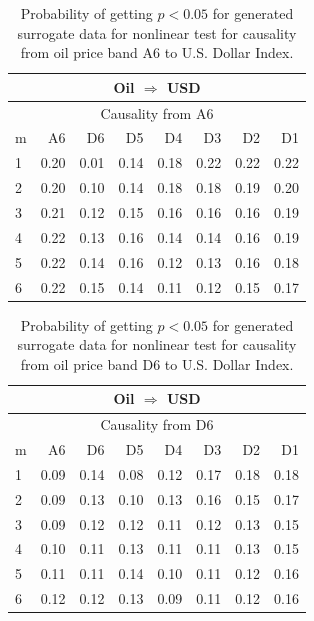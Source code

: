 %
%
\begin{table}[H]
\begin{center}
\begin{tabular}{l|r r r r r r r}
\hline\hline
\multicolumn{8}{c}{Oil $\Rightarrow$ USD}\\
\hline
\multicolumn{8}{c}{Causality from A6}\\
\hline\hline
m & A6 & D6 & D5 & D4 & D3 & D2 & D1 \\
\hline
1 & \cellcolor{mygrey}0.20 & 0.01 & 0.14 & 0.18 & \cellcolor{mygrey}0.22 & 0.22 & \cellcolor{mygrey}0.22 \\
2 & \cellcolor{mygrey}0.20 & 0.10 & 0.14 & 0.18 & \cellcolor{mygrey}0.18 & 0.19 & \cellcolor{mygrey}0.20 \\
3 & \cellcolor{mygrey}0.21 & 0.12 & 0.15 & 0.16 & \cellcolor{mygrey}0.16 & 0.16 & \cellcolor{mygrey}0.19 \\
4 & \cellcolor{mygrey}0.22 & 0.13 & 0.16 & 0.14 & \cellcolor{mygrey}0.14 & 0.16 & \cellcolor{mygrey}0.19 \\
5 & \cellcolor{mygrey}0.22 & 0.14 & 0.16 & 0.12 & \cellcolor{mygrey}0.13 & 0.16 & \cellcolor{mygrey}0.18 \\
6 & \cellcolor{mygrey}0.22 & 0.15 & 0.14 & 0.11 & \cellcolor{mygrey}0.12 & 0.15 & \cellcolor{mygrey}0.17 \\
\hline\hline
\end{tabular}
\caption{Probability of getting $p < 0.05$ for generated surrogate data for nonlinear test for causality from oil price band A6 to U.S. Dollar Index.}
\end{center}
\end{table}

%
%
\begin{table}[H]
\begin{center}
\begin{tabular}{l|r r r r r r r}
\hline\hline
\multicolumn{8}{c}{Oil $\Rightarrow$ USD}\\
\hline
\multicolumn{8}{c}{Causality from D6}\\
\hline\hline
m & A6 & D6 & D5 & D4 & D3 & D2 & D1 \\
\hline
1 & 0.09 & 0.14 & 0.08 & 0.12 & \cellcolor{mygrey}0.17 & 0.18 & 0.18 \\
2 & 0.09 & 0.13 & 0.10 & 0.13 & \cellcolor{mygrey}0.16 & 0.15 & 0.17 \\
3 & 0.09 & 0.12 & 0.12 & 0.11 & \cellcolor{mygrey}0.12 & 0.13 & 0.15 \\
4 & 0.10 & 0.11 & 0.13 & 0.11 & \cellcolor{mygrey}0.11 & 0.13 & 0.15 \\
5 & 0.11 & 0.11 & 0.14 & 0.10 & 0.11 & 0.12 & 0.16 \\
6 & 0.12 & 0.12 & \cellcolor{mygrey}0.13 & 0.09 & \cellcolor{mygrey}0.11 & 0.12 & 0.16 \\
\hline\hline
\end{tabular}
\caption{Probability of getting $p < 0.05$ for generated surrogate data for nonlinear test for causality from oil price band D6 to U.S. Dollar Index.}
\end{center}
\end{table}

